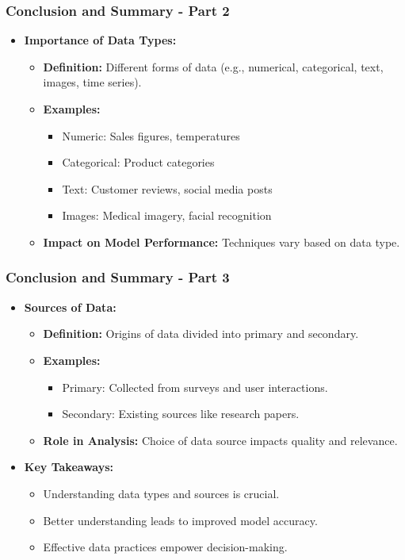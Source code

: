 \documentclass[aspectratio=169]{beamer}
\begin{document}
\begin{frame}[fragile]
    \frametitle{Conclusion and Summary - Part 2}
    \begin{itemize}
        \item \textbf{Importance of Data Types:}
        \begin{itemize}
            \item \textbf{Definition:} Different forms of data (e.g., numerical, categorical, text, images, time series).
            \item \textbf{Examples:}
            \begin{itemize}
                \item Numeric: Sales figures, temperatures
                \item Categorical: Product categories
                \item Text: Customer reviews, social media posts
                \item Images: Medical imagery, facial recognition
            \end{itemize}
            \item \textbf{Impact on Model Performance:} Techniques vary based on data type.
        \end{itemize}
    \end{itemize}
\end{frame}

\begin{frame}[fragile]
    \frametitle{Conclusion and Summary - Part 3}
    \begin{itemize}
        \item \textbf{Sources of Data:}
        \begin{itemize}
            \item \textbf{Definition:} Origins of data divided into primary and secondary.
            \item \textbf{Examples:}
            \begin{itemize}
                \item Primary: Collected from surveys and user interactions.
                \item Secondary: Existing sources like research papers.
            \end{itemize}
            \item \textbf{Role in Analysis:} Choice of data source impacts quality and relevance.
        \end{itemize}
        
        \item \textbf{Key Takeaways:}
        \begin{itemize}
            \item Understanding data types and sources is crucial.
            \item Better understanding leads to improved model accuracy.
            \item Effective data practices empower decision-making.
        \end{itemize}
    \end{itemize}
\end{frame}
\end{document}
